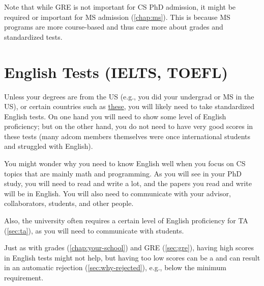\documentclass[oneside,11pt]{book}
\newenvironment{commentbox}[1][]{
  \small
  \begin{marker}[\faChessPawn{}]
    {\textbf{#1}}
  }{
  \end{marker}
}
\newcommand{\red}[1]{{\color{red}{#1}}}
\begin{document}
Note that while GRE is not important for CS PhD admission, it might be required or important for MS admission (\autoref{chap:ms}). This is because MS programs are more course-based and thus care more about grades and standardized tests.

\section{English Tests (IELTS, TOEFL)}\label{sec:english-tests} 

Unless your degrees are from the US (e.g., you did your undergrad or MS in the US), or certain countries such as \href{https://www.gmu.edu/international/english-language-requirements}{these}, you will likely need to take standardized English tests. On one hand you will need to show some level of English proficiency; but on the other hand, you do not need to have very good scores in these tests (many adcom members themselves were once international students and struggled with English).


\begin{commentbox}
  You might wonder why you need to know English well when you focus on CS topics that are mainly math and programming.  
  As you will see in your PhD study, you will need to read and write a lot, and the papers you read and write will be in English.  You will also need to communicate with your advisor, collaborators, students, and other people.
  
  Also, the university often requires a certain level of English proficiency for TA (\autoref{sec:ta}), as you will need to communicate with students. 
\end{commentbox}


Just as with grades (\autoref{chap:your-school}) and GRE (\autoref{sec:gre}), having high scores in English tests might not help, but having too low scores can be a \red{red flag} and can result in an automatic rejection (\autoref{sec:why-rejected}), e.g., below the minimum requirement.
\end{document}
